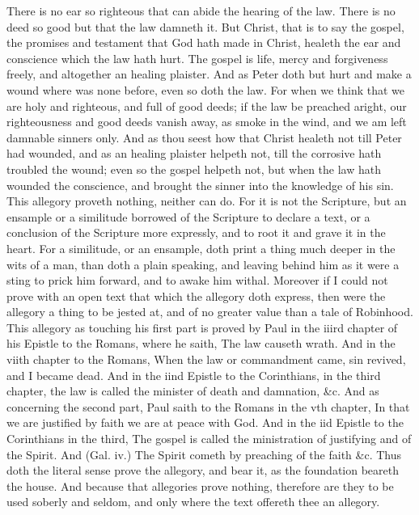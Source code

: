 There is no ear so righteous that can abide the hearing 
of the law. There is no deed so good but that the law 
damneth it. But Christ, that is to say the gospel, the promises
and testament that God hath made in Christ, healeth 
the ear and conscience which the law hath hurt. The 
gospel is life, mercy and forgiveness freely, and altogether 
an healing plaister. And as Peter doth but hurt and 
make a wound where was none before, even so doth the 
law. For when we think that we are holy and righteous, and 
full of good deeds; if the law be preached aright, our righteousness
and good deeds vanish away, as smoke in the 
wind, and we am left damnable sinners only. And as 
thou seest how that Christ healeth not till Peter had 
wounded, and as an healing plaister helpeth not, till the 
corrosive hath troubled the wound; even so the gospel 
helpeth not, but when the law hath wounded the conscience,
and brought the sinner into the knowledge of his 
sin. This allegory proveth nothing, neither can do. For 
it is not the Scripture, but an ensample or a similitude 
borrowed of the Scripture to declare a text, or a conclusion
of the Scripture more expressly, and to root it and 
grave it in the heart. For a similitude, or an ensample, 
doth print a thing much deeper in the wits of a man, than 
doth a plain speaking, and leaving behind him as it were a 
sting to prick him forward, and to awake him withal. 
Moreover if I could not prove with an open text that 
which the allegory doth express, then were the allegory a 
thing to be jested at, and of no greater value than a tale 
of Robinhood. This allegory as touching his first part is 
proved by Paul in the iiird chapter of his Epistle to the 
Romans, where he saith, The law causeth wrath. And 
in the viith chapter to the Romans, When the law or 
commandment came, sin revived, and I became dead. 
And in the iind Epistle to the Corinthians, in the third 
chapter, the law is called the minister of death and damnation,
\&c. And as concerning the second part, Paul 
saith to the Romans in the vth chapter, In that we are 
justified by faith we are at peace with God. And in the 
iid Epistle to the Corinthians in the third, The gospel is 
called the ministration of justifying and of the Spirit. 
And (Gal. iv.) The Spirit cometh by preaching of the faith 
\&c. Thus doth the literal sense prove the allegory, and 
bear it, as the foundation beareth the house. And because 
that allegories prove nothing, therefore are they to be used 
soberly and seldom, and only where the text offereth thee 
an allegory. 

